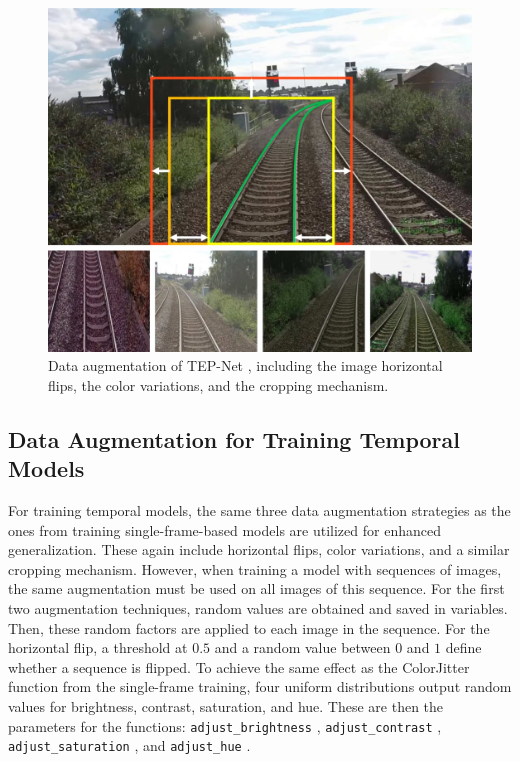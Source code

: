 \begin{figure}[H]
    \centering
    \includegraphics[width=0.6\linewidth]{PICs/Baselinepaper/data_augmenation.jpg}
    \caption{Data augmentation of \ac{TEP}-Net \cite{tepNet2024}, including the image horizontal flips, the color variations, and the cropping mechanism.}
    \label{fig:tepNet_dataaugmentation}
\end{figure}

\subsection{Data Augmentation for Training Temporal Models}
\label{sec:dataAugmentationTemporal}

For training temporal models, the same three data augmentation strategies as the ones from training single-frame-based models are utilized for enhanced generalization.
These again include horizontal flips, color variations, and a similar cropping mechanism.
However, when training a model with sequences of images, the same augmentation must be used on all images of this sequence.
For the first two augmentation techniques, random values are obtained and saved in variables.
Then, these random factors are applied to each image in the sequence.
For the horizontal flip, a threshold at $0.5$ and a random value between $0$ and $1$ define whether a sequence is flipped.
To achieve the same effect as the ColorJitter \cite{pytorch_colorJitter_docu} function from the single-frame training, four uniform distributions output random values for brightness, contrast, saturation, and hue.
These are then the parameters for the functions: \texttt{adjust\_brightness} \cite{pytorch_adjust_brightness_docu}, \texttt{adjust\_contrast} \cite{pytorch_adjust_contrast_docu}, \texttt{adjust\_saturation} \cite{pytorch_adjust_saturation_docu}, and \texttt{adjust\_hue} \cite{pytorch_adjust_hue_docu}.

